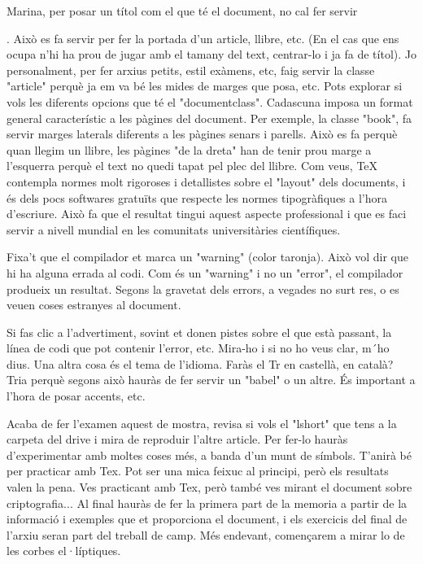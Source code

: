 Marina, per posar un títol com el que té el document, no cal fer servir \maketitle. Això es fa servir per fer la portada d'un article, llibre, etc. (En el cas que ens ocupa n'hi ha prou de jugar amb el tamany del text, centrar-lo i ja fa de títol). Jo personalment, per fer arxius petits, estil exàmens, etc, faig servir la classe "article" perquè ja em va bé les mides de marges que posa, etc. Pots explorar si vols les diferents opcions que té el "documentclass". Cadascuna imposa un format general característic a les pàgines del document. Per exemple, la classe "book", fa servir marges laterals diferents a les pàgines senars i parells. Això es fa perquè quan llegim un llibre, les pàgines "de la dreta" han de tenir prou marge a l'esquerra perquè el text no quedi tapat pel plec del llibre. Com veus, TeX contempla normes molt rigoroses i detallistes sobre el "layout" dels documents, i és dels pocs softwares gratuïts que respecte les normes tipogràfiques a l'hora d'escriure. Això fa que el resultat tingui aquest aspecte professional i que es faci servir a nivell mundial en les comunitats universitàries científiques.

Fixa't que el compilador et marca un "warning" (color taronja). Això vol dir que hi ha alguna errada al codi. Com és un "warning" i no un "error", el compilador produeix un resultat. Segons la gravetat dels errors, a vegades no surt res, o es veuen coses estranyes al document.

Si fas clic a l'advertiment, sovint et donen pistes sobre el que està passant, la línea de codi que pot contenir l'error, etc. Mira-ho i si no ho veus clar, m´ho dius.
Una altra cosa és el tema de l'idioma. Faràs el Tr en castellà, en català? Tria perquè segons això hauràs de fer servir un "babel" o un altre. És important a l'hora de posar accents, etc. 

Acaba de fer l'examen aquest de mostra, revisa si vols el "lshort" que tens a la carpeta del drive i mira de reproduir l'altre article. Per fer-lo hauràs d'experimentar amb moltes coses més, a banda d'un munt de símbols. T'anirà bé per practicar amb Tex. Pot ser una mica feixuc al principi, però els resultats valen la pena. Ves practicant amb Tex, però també ves mirant el document sobre criptografia... Al final hauràs de fer la primera part de la memoria a partir de la informació i exemples que et proporciona el document, i els exercicis del final de l'arxiu seran part del treball de camp. Més endevant, començarem a mirar lo de les corbes el·líptiques.

